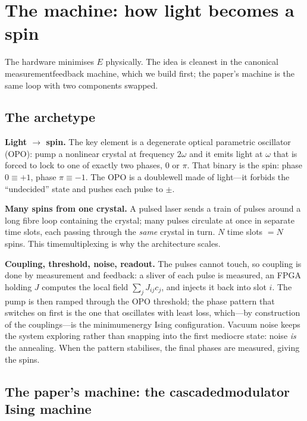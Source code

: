 \documentclass[11pt]{article}
\begin{document}
\section{The machine: how light becomes a spin}

The hardware minimises $E$ physically. The idea is cleanest in the canonical measurement\text{-}feedback machine, which we build first; the paper's machine is the same loop with two components swapped.

\subsection{The archetype}

\textbf{Light $\to$ spin.} The key element is a degenerate optical parametric oscillator (OPO): pump a nonlinear crystal at frequency $2\omega$ and it emits light at $\omega$ that is forced to lock to one of exactly two phases, $0$ or $\pi$. That binary is the spin: phase $0\equiv+1$, phase $\pi\equiv-1$. The OPO is a double\text{-}well made of light---it forbids the ``undecided'' state and pushes each pulse to $\pm$.

\textbf{Many spins from one crystal.} A pulsed laser sends a train of pulses around a long fibre loop containing the crystal; many pulses circulate at once in separate time slots, each passing through the \emph{same} crystal in turn. $N$ time slots $=N$ spins. This time\text{-}multiplexing is why the architecture scales.

\textbf{Coupling, threshold, noise, readout.} The pulses cannot touch, so coupling is done by measurement and feedback: a sliver of each pulse is measured, an FPGA holding $J$ computes the local field $\sum_j J_{ij}c_j$, and injects it back into slot $i$. The pump is then ramped through the OPO threshold; the phase pattern that switches on first is the one that oscillates with least loss, which---by construction of the couplings---is the minimum\text{-}energy Ising configuration. Vacuum noise keeps the system exploring rather than snapping into the first mediocre state: noise \emph{is} the annealing. When the pattern stabilises, the final phases are measured, giving the spins.

\subsection{The paper's machine: the cascaded\text{-}modulator Ising machine}
\end{document}
